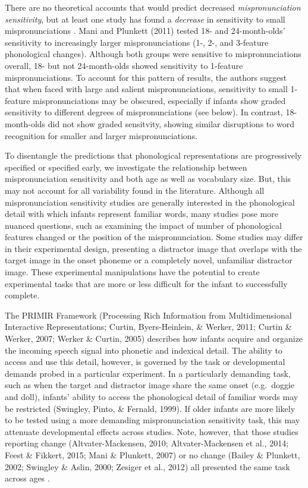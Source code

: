 \documentclass[man]{apa6}
\begin{document}
There are no theoretical accounts that would predict decreased \emph{mispronunciation sensitivity}, but at least one study has found a \emph{decrease} in sensitivity to small mispronunciations . Mani and Plunkett (2011) tested 18- and 24-month-olds' sensitivity to increasingly larger mispronunciations (1-, 2-, and 3-feature phonological changes). Although both groups were sensitive to mispronunciations overall, 18- but not 24-month-olds showed sensitivity to 1-feature mispronunciations. To account for this pattern of results, the authors suggest that when faced with large and salient mispronunciations, sensitivity to small 1-feature mispronunciations may be obscured, especially if infants show graded sensitivity to different degrees of mispronunciations (see below). In contrast, 18-month-olds did not show graded sensitvity, showing similar disruptions to word recognition for smaller and larger mispronunciations.

To disentangle the predictions that phonological representations are progressively specified or specified early, we investigate the relationship between mispronunciation sensitivity and both age as well as vocabulary size. But, this may not account for all variability found in the literature. Although all mispronunciation sensitivity studies are generally interested in the phonological detail with which infants represent familiar words, many studies pose more nuanced questions, such as examining the impact of number of phonological features changed or the position of the mispronunciation. Some studies may differ in their experimental design, presenting a distractor image that overlaps with the target image in the onset phoneme or a completely novel, unfamiliar distractor image. These experimental manipulations have the potential to create experimental tasks that are more or less difficult for the infant to successfully complete.

The PRIMIR Framework (Processing Rich Information from Multidimensional Interactive Representations; Curtin, Byers-Heinlein, \& Werker, 2011; Curtin \& Werker, 2007; Werker \& Curtin, 2005) describes how infants acquire and organize the incoming speech signal into phonetic and indexical detail. The ability to access and use this detail, however, is governed by the task or developmental demands probed in a particular experiment. In a particularly demanding task, such as when the target and distractor image share the same onset (e.g.~doggie and doll), infants' ability to access the phonological detail of familiar words may be restricted (Swingley, Pinto, \& Fernald, 1999). If older infants are more likely to be tested using a more demanding mispronunciation sensitivity task, this may attenuate developmental effects across studies. Note, however, that those studies reporting change (Altvater-Mackensen, 2010; Altvater-Mackensen et al., 2014; Feest \& Fikkert, 2015; Mani \& Plunkett, 2007) or no change (Bailey \& Plunkett, 2002; Swingley \& Aslin, 2000; Zesiger et al., 2012) all presented the same task across ages .
\end{document}

